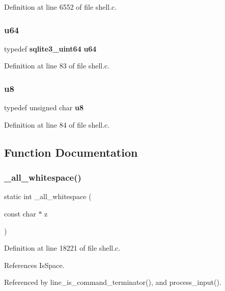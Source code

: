 Definition at line 6552 of file shell.\+c.

\mbox{\label{shell_8c_a510e88e5fe50c5bcf5b3ff1ad131e109}} 
\subsubsection{u64}
{\footnotesize\ttfamily typedef \textbf{ sqlite3\+\_\+uint64} \textbf{ u64}}



Definition at line 83 of file shell.\+c.

\mbox{\label{shell_8c_aed742c436da53c1080638ce6ef7d13de}} 
\subsubsection{u8}
{\footnotesize\ttfamily typedef unsigned char \textbf{ u8}}



Definition at line 84 of file shell.\+c.



\subsection{Function Documentation}
\mbox{\label{shell_8c_a908f756e9954cea801a5daa7e757e0de}} 
\subsubsection{\+\_\+all\+\_\+whitespace()}
{\footnotesize\ttfamily static int \+\_\+all\+\_\+whitespace (\begin{DoxyParamCaption}\item[{const char $\ast$}]{z }\end{DoxyParamCaption})\hspace{0.3cm}{\ttfamily [static]}}



Definition at line 18221 of file shell.\+c.



References Is\+Space.



Referenced by line\+\_\+is\+\_\+command\+\_\+terminator(), and process\+\_\+input().


